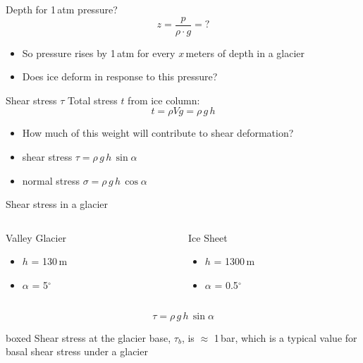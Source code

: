\documentclass[hide notes,intlimits,unknownkeysallowed]{beamer}
\begin{document}
\begin{frame}{Depth for 1\,atm pressure?}
    \begin{displaymath}
       z = \frac{p}{\rho\cdot g} = ?
     \end{displaymath}
     \begin{itemize}
     \item  So pressure rises by 1\,atm for every \alert{$x$}\,meters of depth in a glacier
     \item Does ice deform in response to this pressure?
     \end{itemize}
\end{frame}


\begin{frame}{Shear stress $\tau$}
  Total stress $t$ from ice column:
    \begin{displaymath}
       t = \rho V g = \rho\,g\,h
     \end{displaymath}
     \begin{itemize}
     \item How much of this weight will contribute to shear deformation?
     \item shear stress $\tau = \rho\,g\,h\,\sin{\alpha}$
     \item normal stress $\sigma = \rho\,g\,h\,\cos{\alpha}$
    \end{itemize}
\end{frame}


\begin{frame}{Shear stress in a glacier}
\begin{columns}[c]
  \begin{column}{.5\textwidth}
    \begin{block}{Valley Glacier}
      \begin{itemize}
      \item $h$ = 130\,m
      \item $\alpha$ = 5$^{\circ}$
      \end{itemize}
    \end{block}
  \end{column}
  \begin{column}{.5\textwidth}
    \begin{block}{Ice Sheet}
  \begin{itemize}
  \item $h$ = 1300\,m
  \item $\alpha$ = 0.5$^{\circ}$
  \end{itemize}
\end{block}
\end{column}
\end{columns}
\vspace{1em}
\begin{displaymath}
    \tau = \rho\,g\,h\,\sin{\alpha}
  \end{displaymath}
  \begin{beamercolorbox}[rounded=true,shadow=true]{boxed}
    Shear stress at the glacier base, $\tau_{b}$, is $\approx$ 1\,bar, which is a typical value for basal shear stress under a glacier
  \end{beamercolorbox}
\end{frame}
   
\end{document}
